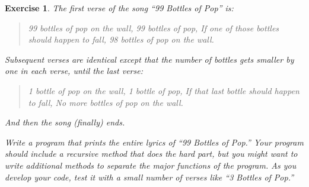 \documentclass[12pt]{book}
\theoremstyle{exercise}
\newtheorem{exercise}{Exercise}[chapter]
\begin{document}
\begin{exercise}
The first verse of the song ``99 Bottles of Pop'' is:

\begin{quote}
99 bottles of pop on the wall,
99 bottles of pop,
If one of those bottles should happen to fall,
98 bottles of pop on the wall.
\end{quote}

Subsequent verses are identical except that the number of bottles gets smaller by one in each verse, until the last verse:

\begin{quote}
1 bottle of pop on the wall,
1 bottle of pop,
If that last bottle should happen to fall,
No more bottles of pop on the wall.
\end{quote}

And then the song (finally) ends.

Write a program that prints the entire lyrics of ``99 Bottles of Pop.''
Your program should include a {\it recursive} method that does the hard part, but you might want to write additional methods to separate the major functions of the program.
As you develop your code, test it with a small number of verses like ``3 Bottles of Pop.''

\end{exercise}
\end{document}
